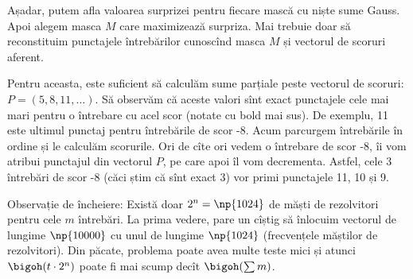 Așadar, putem afla valoarea surprizei pentru fiecare mască cu niște sume Gauss. Apoi alegem masca $M$ care maximizează surpriza. Mai trebuie doar să reconstituim punctajele întrebărilor cunoscînd masca $M$ și vectorul de scoruri aferent.

Pentru aceasta, este suficient să calculăm sume parțiale peste vectorul de scoruri: $P=(5, 8, 11, \dots)$. Să observăm că aceste valori sînt exact punctajele cele mai mari pentru o întrebare cu acel scor (notate cu bold mai sus). De exemplu, 11 este ultimul punctaj pentru întrebările de scor -8. Acum parcurgem întrebările în ordine și le calculăm scorurile. Ori de cîte ori vedem o întrebare de scor -8, îi vom atribui punctajul din vectorul $P$, pe care apoi îl vom decrementa. Astfel, cele 3 întrebări de scor -8 (căci știm că sînt exact 3) vor primi punctajele 11, 10 și 9.

Observație de încheiere: Există doar $2^n = \np{1024}$ de măști de rezolvitori pentru cele $m$ întrebări. La prima vedere, pare un cîștig să înlocuim vectorul de lungime $\np{10000}$ cu unul de lungime $\np{1024}$ (frecvențele măștilor de rezolvitori). Din păcate, problema poate avea multe teste mici și atunci $\bigoh(t \cdot 2^n)$ poate fi mai scump decît $\bigoh(\sum m)$.
